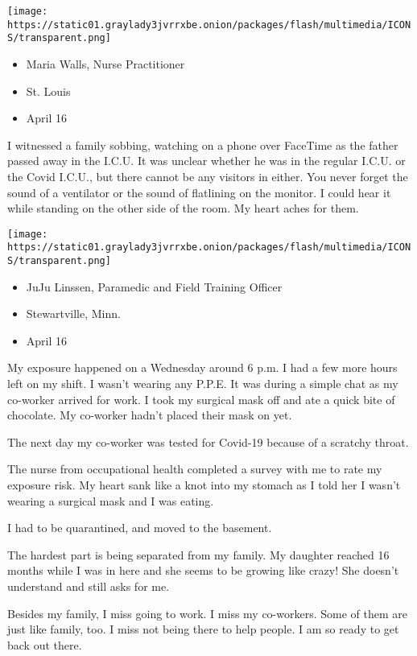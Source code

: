 \texttt{[image: https://static01.graylady3jvrrxbe.onion/packages/flash/multimedia/ICONS/transparent.png]}

\begin{itemize}
\tightlist
\item
  Maria Walls, Nurse Practitioner
\item
  St. Louis
\item
  April 16
\end{itemize}

I witnessed a family sobbing, watching on a phone over FaceTime as the
father passed away in the I.C.U. It was unclear whether he was in the
regular I.C.U. or the Covid I.C.U., but there cannot be any visitors in
either. You never forget the sound of a ventilator or the sound of
flatlining on the monitor. I could hear it while standing on the other
side of the room. My heart aches for them.

\texttt{[image: https://static01.graylady3jvrrxbe.onion/packages/flash/multimedia/ICONS/transparent.png]}

\begin{itemize}
\tightlist
\item
  JuJu Linssen, Paramedic and Field Training Officer
\item
  Stewartville, Minn.
\item
  April 16
\end{itemize}

My exposure happened on a Wednesday around 6 p.m. I had a few more hours
left on my shift. I wasn't wearing any P.P.E. It was during a simple
chat as my co-worker arrived for work. I took my surgical mask off and
ate a quick bite of chocolate. My co-worker hadn't placed their mask on
yet.

The next day my co-worker was tested for Covid-19 because of a scratchy
throat.

The nurse from occupational health completed a survey with me to rate my
exposure risk. My heart sank like a knot into my stomach as I told her I
wasn't wearing a surgical mask and I was eating.

I had to be quarantined, and moved to the basement.

The hardest part is being separated from my family. My daughter reached
16 months while I was in here and she seems to be growing like crazy!
She doesn't understand and still asks for me.

Besides my family, I miss going to work. I miss my co-workers. Some of
them are just like family, too. I miss not being there to help people. I
am so ready to get back out there.

